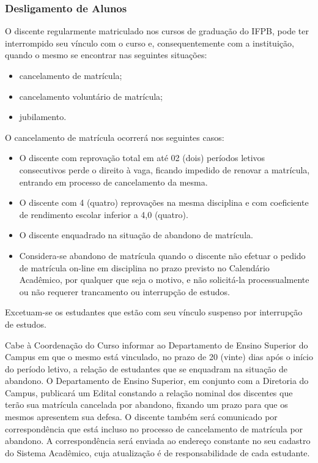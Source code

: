 \subsubsection{Desligamento de Alunos}

	O discente regularmente matriculado nos cursos de graduação do IFPB, pode ter interrompido seu vínculo com o curso e, consequentemente com a instituição, quando o mesmo se encontrar nas seguintes situações:
	\begin{itemize}
		\item cancelamento de matrícula;

		\item cancelamento voluntário de matrícula; 
	
		\item jubilamento.
	\end{itemize}

	O cancelamento de matrícula ocorrerá nos seguintes casos:

	\begin{itemize}
		\item O discente com reprovação total em até 02 (dois) períodos letivos consecutivos perde o direito à vaga, ficando impedido de renovar a matrícula, entrando em processo de cancelamento da mesma.

		\item O discente com 4 (quatro) reprovações na mesma disciplina e com coeficiente de rendimento escolar inferior a 4,0 (quatro).

		\item O discente enquadrado na situação de abandono de matrícula.

		\item Considera-se abandono de matrícula quando o discente não efetuar o pedido de matrícula on-line em disciplina no prazo previsto no Calendário Acadêmico, por qualquer que seja o motivo, e não solicitá-la processualmente ou não requerer trancamento ou interrupção de estudos.
		\end{itemize}
		
		Excetuam-se os estudantes que estão com seu vínculo suspenso por interrupção de estudos.

		Cabe à Coordenação do Curso informar ao Departamento de Ensino Superior do Campus em que o mesmo está vinculado, no prazo de 20 (vinte) dias após o início do período letivo, a relação de estudantes que se enquadram na situação de abandono. O Departamento de Ensino Superior, em conjunto com a Diretoria do Campus, publicará um Edital constando a relação nominal dos discentes que terão sua matrícula cancelada por abandono, fixando um prazo para que os mesmos apresentem sua defesa. O discente também será comunicado por correspondência que está incluso no processo de cancelamento de matrícula por abandono. A correspondência será enviada ao endereço constante no seu cadastro do Sistema Acadêmico, cuja atualização é de responsabilidade de cada estudante.


